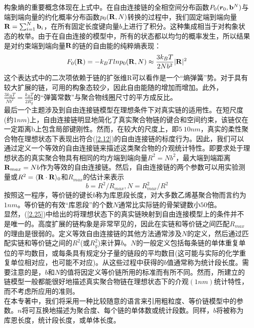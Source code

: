 构象熵的重要概念体现在上式中。在自由连接链的全相空间分布函数$P_0(\bm{r}_0,\mathbf{b}^{N})$与端到端向量的约化概率分布函数$p_0(\mathbf{R},N)$转换的过程中，我们固定端到端向量$\mathbf{R}=\sum _{i=1}^{N} \mathbf{b}_{i}$，在所有固定长度键向量$b$上进行了积分。这种集成相当于对构象状态的枚举。由于在自由连接的模型中，所有的状态都以均匀的概率发生，所以结果是对约束端到端向量$\mathbf{R}$的链的自由能的纯粹熵表现：\\
\begin{equation}
F_0(\mathbf{R})=-k_{B}Tlnp_0(\mathbf{R},N)\approx \frac{3k_{B}T}{2Nb^2}|\mathbf{R}|^2
\label{2.24}
\end{equation}
这个表达式中的二次项依赖于链的扩张维R可以看作是一个“熵弹簧”势。对于具有较大扩展的链，可用的构象态较少，因此自由能随的增加而增加。此外，$\frac{3k_{B}T}{Nb^2}=\frac{k_{B}T}{2R^2_{g}}$的“弹簧常数”与聚合物线圈尺寸的平方成反比。\\

最后一个主题涉及到自由连接链模型在理想条件下对真实链的适用性。在短尺度(约$1nm$)上，自由连接链明显地简化了真实聚合物链的键合和空间约束，该链仅在一定距离b上包含局部键刚性。然而，在较大的尺度上，即$5~10nm$，真实的柔性聚合物在理想状态下表现出符合(\ref{2.12})的自由连接链的标度行为。因此，我们可以通过定义一个等效的自由连接链来描述这类聚合物的介观统计特性。即要求处于理想状态的真实聚合物具有相同的均方端到端向量$R^2=Nb^2$，最大端到端距离$\mathbf{R}_{max}=Nb$作为等效的自由连接链。然后，自由连接链的两个参数可以用实验测量或$R^2=\langle \mathbf{R} \cdot \mathbf{R}\rangle_{0}$和$R_{max}$的估计来表示\\
\begin{equation}
b=R^2/R_{max},N=R_{max}^{2}/R^2
\label{2.25}
\end{equation}
按照这一程序，等价链的键长$b$称为库恩段长度，对大多数乙烯基聚合物而言约为$1nm$。等价链的有效“库恩段”的个数$N$通常比实际链的骨架键数小$50$倍。\\

显然，(\ref{2.25})中给出的将理想状态下的真实链映射到自由连接模型上的条件并不是唯一的。高度扩展的链构象是非常罕见的，因此在实链和等价链之间匹配$R_{max}$的理由是很弱的。定义等效自由连接链的其他方法通常涉及$N$的定义，然后通过匹配实链和等价链之间的$R^2$(或$R_{g}^{2}$)来计算$b$。$N$的一般定义包括每条链的单体重复单位的平均数目，或每条具有规定分子量的链段的平均数目(这可能与实际的化学重复单位相对应，也可能不对应)。从这些过程中获得的$b$值通常称为统计段长度。需要注意的是，$b$和$N$的值将因定义等价链所用的标准而有所不同。然而，所建立的链模型一般都能很好地描述真实聚合物链在理想状态下的介观$(1nm)$统计特性，而不考虑所应用的准则。\\

在本专著中，我们将采用一种比较随意的语言来引用粗粒度、等价链模型中的参数。$n$将可互换地描述为聚合度、每个链的单体数或统计段数。同样，$b$将被称为库恩长度，统计段长度，或单体长度。\\
\endinput
